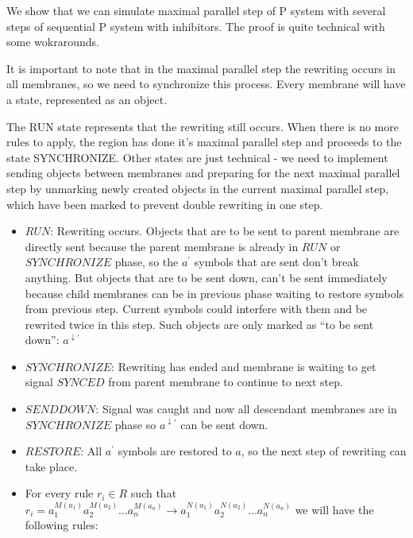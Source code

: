 \begin{dokaz}
  We show that we can simulate maximal parallel step of P system with several steps of sequential P system with inhibitors. The proof is quite technical with some wokrarounds.


  It is important to note that in the maximal parallel step the rewriting occurs in all membranes, so we need to synchronize this process. Every membrane will have a state, represented as an object.

  The RUN state represents that the rewriting still occurs. When there is no more rules to apply, the region has done it's maximal parallel step and proceeds to the state SYNCHRONIZE. Other states are just technical - we need to implement sending objects between membranes and preparing for the next maximal parallel step by unmarking newly created objects in the current maximal parallel step, which have been marked to prevent double rewriting in one step.

  \begin{itemize}
    \item $RUN$: Rewriting occurs. Objects that are to be sent to parent membrane are directly sent because the parent membrane is already in $RUN$ or $SYNCHRONIZE$ phase, so the $a^{\prime}$ symbols that are sent don't break anything. But objects that are to be sent down, can't be sent immediately because child membranes can be in previous phase waiting to restore symbols from previous step. Current symbols could interfere with them and be rewrited twice in this step. Such objects are only marked as ``to be sent down'': $a^{\downarrow\prime}$

    \item $SYNCHRONIZE$: Rewriting has ended and membrane is waiting to get signal $SYNCED$ from parent membrane to continue to next step.

    \item $SENDDOWN$: Signal was caught and now all descendant membranes are in $SYNCHRONIZE$ phase so $a^{\downarrow\prime}$ can be sent down.

    \item $RESTORE$: All $a^{\prime}$ symbols are restored to $a$, so the next step of rewriting can take place.
  \end{itemize}


  \begin{itemize}
    \item For every rule $r_i\in R$ such that $r_i = a_1^{M(a_1)}a_2^{M(a_2)}\dots a_n^{M(a_n)} \rightarrow a_1^{N(a_1)}a_2^{N(a_2)}\dots a_n^{N(a_n)}$ we will have the following rules:
  

\end{itemize}
\end{dokaz}
